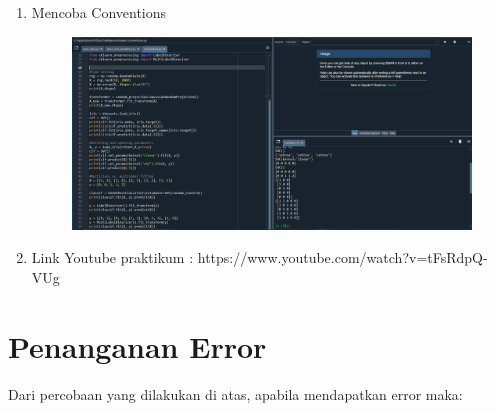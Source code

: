 \begin{enumerate}
\begin{figure}[!htbp]
\end{figure}
\newpage
\item 
Mencoba Conventions
\begin{figure}[!htbp]
	\centering
	\includegraphics[scale=0.4]{figures/convention.PNG}
\end{figure}
\newpage
\item Link Youtube praktikum : https://www.youtube.com/watch?v=tFsRdpQ-VUg
\end{enumerate}


\section{Penanganan Error}
Dari percobaan yang dilakukan di atas, apabila mendapatkan error maka:

